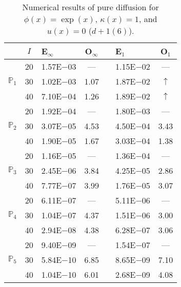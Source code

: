 \begin{table}[H]
\centering
\caption{Numerical results of pure diffusion for $\phi(x)=\exp(x)$, $\kappa(x)=1$, and $u(x)=0$ ($d+1(6)$).}
\begin{tabular}{@{}l c l c c l c@{}}
\toprule
 & $I$ & E$_{\infty}$ & O$_{\infty}$ && E$_1$ & O$_1$\\
\midrule
\multirow{3}{*}{$\mathbb{P}_{1}$}
 & 20 & 1.57E$-$03 & --- && 1.15E$-$02 & ---\\
 & 30 & 1.02E$-$03 & 1.07 && 1.87E$-$02 & $\uparrow$\\
 & 40 & 7.10E$-$04 & 1.26 && 1.89E$-$02 & $\uparrow$\\
\midrule
\multirow{3}{*}{$\mathbb{P}_{2}$}
 & 20 & 1.92E$-$04 & --- && 1.80E$-$03 & ---\\
 & 30 & 3.07E$-$05 & 4.53 && 4.50E$-$04 & 3.43\\
 & 40 & 1.90E$-$05 & 1.67 && 3.03E$-$04 & 1.38\\
\midrule
\multirow{3}{*}{$\mathbb{P}_{3}$}
 & 20 & 1.16E$-$05 & --- && 1.36E$-$04 & ---\\
 & 30 & 2.45E$-$06 & 3.84 && 4.25E$-$05 & 2.86\\
 & 40 & 7.77E$-$07 & 3.99 && 1.76E$-$05 & 3.07\\
\midrule
\multirow{3}{*}{$\mathbb{P}_{4}$}
 & 20 & 6.11E$-$07 & --- && 5.11E$-$06 & ---\\
 & 30 & 1.04E$-$07 & 4.37 && 1.51E$-$06 & 3.00\\
 & 40 & 2.94E$-$08 & 4.38 && 6.28E$-$07 & 3.06\\
\midrule
\multirow{3}{*}{$\mathbb{P}_{5}$}
 & 20 & 9.40E$-$09 & --- && 1.54E$-$07 & ---\\
 & 30 & 5.84E$-$10 & 6.85 && 8.65E$-$09 & 7.10\\
 & 40 & 1.04E$-$10 & 6.01 && 2.68E$-$09 & 4.08\\
\bottomrule
\end{tabular}
\end{table}
